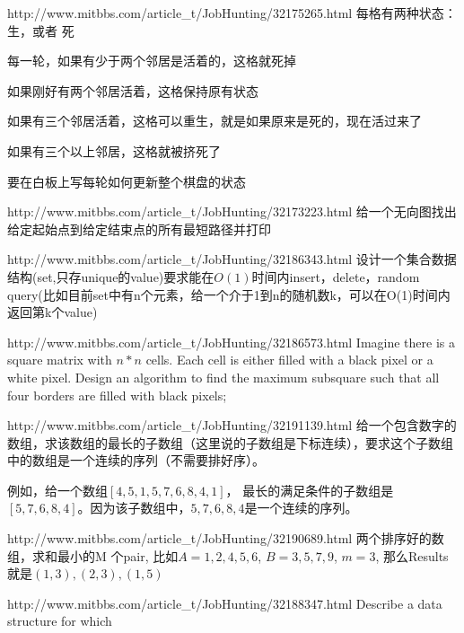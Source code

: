\documentclass[a4paper]{article}
\begin{document}
\begin{CJK}{UTF8}{gbsn}
\begin{enumerate}
\begin{Q}[Google]{http://www.mitbbs.com/article_t/JobHunting/32175265.html}
每格有两种状态：生，或者 死

每一轮，如果有少于两个邻居是活着的，这格就死掉

如果刚好有两个邻居活着，这格保持原有状态

如果有三个邻居活着，这格可以重生，就是如果原来是死的，现在活过来了

如果有三个以上邻居，这格就被挤死了

要在白板上写每轮如何更新整个棋盘的状态
\end{Q}

\begin{Q}[Amazon]{http://www.mitbbs.com/article_t/JobHunting/32173223.html}
给一个无向图找出给定起始点到给定结束点的所有最短路径并打印
\end{Q}

\begin{Q}[Google]{http://www.mitbbs.com/article_t/JobHunting/32186343.html}
设计一个集合数据结构(set,只存unique的value)要求能在$O(1)$时间内insert，delete，random query(比如目前set中有n个元素，给一个介于1到n的随机数k，可以在O(1)时间内返回第k个value)
\end{Q}

\begin{Q}{http://www.mitbbs.com/article_t/JobHunting/32186573.html}
Imagine there is a square matrix with $n * n$ cells. Each cell is either filled with a black pixel or a white pixel. Design an algorithm to find the maximum subsquare such that all four borders are filled with black pixels;
\end{Q}

\begin{Q}{http://www.mitbbs.com/article_t/JobHunting/32191139.html}
给一个包含数字的数组，求该数组的最长的子数组（这里说的子数组是下标连续），要求这个子数组中的数组是一个连续的序列（不需要排好序）。

例如，给一个数组$[4,5,1,5,7,6,8,4,1]$， 最长的满足条件的子数组是$[5,7,6,8,4]$。因为该子数组中，$5,7,6,8,4$是一个连续的序列。
\end{Q}

\begin{Q}{http://www.mitbbs.com/article_t/JobHunting/32190689.html}
两个排序好的数组，求和最小的M 个pair, 比如$A={1, 2, 4, 5, 6}$, $B={3, 5, 7, 9}$, $m=3$, 那么Results就是$(1, 3),(2, 3),(1, 5)$
\end{Q}

\begin{Q}[Microsoft]{http://www.mitbbs.com/article_t/JobHunting/32188347.html}
Describe a data structure for which 


\end{Q}
\end{enumerate}
\end{CJK}
\end{document}

